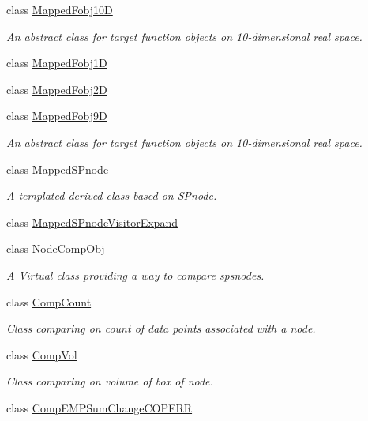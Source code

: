 \begin{DoxyCompactItemize}
class \hyperlink{classsubpavings_1_1MappedFobj10D}{\-Mapped\-Fobj10\-D}
\begin{DoxyCompactList}\small\item\em \-An abstract class for target function objects on 10-\/dimensional real space. \end{DoxyCompactList}\item 
class \hyperlink{classsubpavings_1_1MappedFobj1D}{\-Mapped\-Fobj1\-D}
\item 
class \hyperlink{classsubpavings_1_1MappedFobj2D}{\-Mapped\-Fobj2\-D}
\item 
class \hyperlink{classsubpavings_1_1MappedFobj9D}{\-Mapped\-Fobj9\-D}
\begin{DoxyCompactList}\small\item\em \-An abstract class for target function objects on 10-\/dimensional real space. \end{DoxyCompactList}\item 
class \hyperlink{classsubpavings_1_1MappedSPnode}{\-Mapped\-S\-Pnode}
\begin{DoxyCompactList}\small\item\em \-A templated derived class based on \hyperlink{classsubpavings_1_1SPnode}{\-S\-Pnode}. \end{DoxyCompactList}\item 
class \hyperlink{classsubpavings_1_1MappedSPnodeVisitorExpand}{\-Mapped\-S\-Pnode\-Visitor\-Expand}
\item 
class \hyperlink{classsubpavings_1_1NodeCompObj}{\-Node\-Comp\-Obj}
\begin{DoxyCompactList}\small\item\em \-A \-Virtual class providing a way to compare spsnodes. \end{DoxyCompactList}\item 
class \hyperlink{classsubpavings_1_1CompCount}{\-Comp\-Count}
\begin{DoxyCompactList}\small\item\em \-Class comparing on count of data points associated with a node. \end{DoxyCompactList}\item 
class \hyperlink{classsubpavings_1_1CompVol}{\-Comp\-Vol}
\begin{DoxyCompactList}\small\item\em \-Class comparing on volume of box of node. \end{DoxyCompactList}\item 
class \hyperlink{classsubpavings_1_1CompEMPSumChangeCOPERR}{\-Comp\-E\-M\-P\-Sum\-Change\-C\-O\-P\-E\-R\-R}

\end{DoxyCompactItemize}
